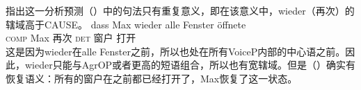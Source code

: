 
 \citet{JB2003a-u}指出这一分析预测（）中的句法只有重复意义，即在该意义中，wieder（再次）的辖域高于CAUSE。
\ea
\label{ex-wieder-alle}
\gll dass Max wieder alle Fenster öffnete\\
    \textsc{comp} Max 再次 \textsc{det} 窗户 打开\\
\z
这是因为wieder在alle Fenster之前，所以也处在所有VoiceP内部的中心语之前。因此，wieder只能与AgrOP或者更高的短语组合，所以也有宽辖域。但是（）确实有恢复语义：所有的窗户在之前都已经打开了，Max恢复了这一状态。

